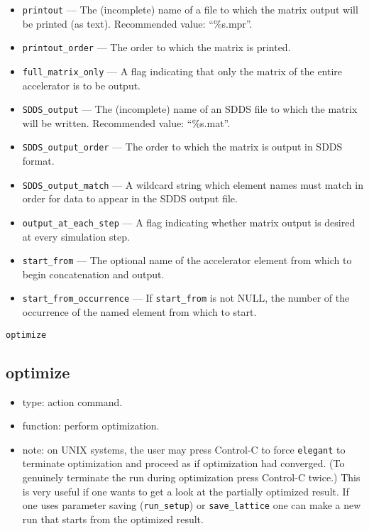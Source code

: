 \documentclass[11pt]{article}
\begin{document}
\begin{itemize}
\item \verb|printout| --- The (incomplete) name of a file to which the 
matrix output will be printed (as text).  Recommended value: ``\%s.mpr''.
\item \verb|printout_order| --- The order to which the matrix is printed.
\item \verb|full_matrix_only| --- A flag indicating that only the matrix of
the entire accelerator is to be output.
\item \verb|SDDS_output| --- The (incomplete) name of an SDDS 
file to which the matrix will be written.  Recommended value: ``\%s.mat''.
\item \verb|SDDS_output_order| --- The order to which the matrix is output in SDDS format.
\item \verb|SDDS_output_match| --- A wildcard string which element names must match in
order for data to appear in the SDDS output file.
\item \verb|output_at_each_step| --- A flag indicating whether matrix output
is desired at every simulation step.
\item \verb|start_from| --- The optional name of the accelerator element
from which to begin concatenation and output.
\item \verb|start_from_occurrence| --- If \verb|start_from| is not NULL, the
number of the occurrence of the named element from which to start.
\end{itemize}

\begin{latexonly}
\newpage
\begin{center}{\Large\verb|optimize|}\end{center}
\end{latexonly}
\subsection{optimize}

\begin{itemize}
\item type: action command.
\item function: perform optimization.
\item note: on UNIX systems, the user may press Control-C to force
\verb|elegant| to terminate optimization and proceed as if
optimization had converged.  (To genuinely terminate the run during
optimization press Control-C twice.) This is very useful if one wants
to get a look at the partially optimized result.  If one uses parameter
saving (\verb|run_setup|) or \verb|save_lattice| one can make a new
run that starts from the optimized result.

\end{itemize}
\end{document}
